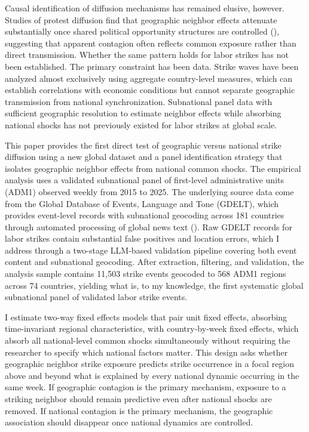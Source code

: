 \documentclass[
  11pt,
]{article}
\begin{document}
Causal identification of diffusion mechanisms has remained elusive,
however. Studies of protest diffusion find that geographic neighbor
effects attenuate substantially once shared political opportunity
structures are controlled (), suggesting that apparent contagion often
reflects common exposure rather than direct transmission. Whether the
same pattern holds for labor strikes has not been established. The
primary constraint has been data. Strike waves have been analyzed almost
exclusively using aggregate country-level measures, which can establish
correlations with economic conditions but cannot separate geographic
transmission from national synchronization. Subnational panel data with
sufficient geographic resolution to estimate neighbor effects while
absorbing national shocks has not previously existed for labor strikes
at global scale.

This paper provides the first direct test of geographic versus national
strike diffusion using a new global dataset and a panel identification
strategy that isolates geographic neighbor effects from national common
shocks. The empirical analysis uses a validated subnational panel of
first-level administrative units (ADM1) observed weekly from 2015 to
2025. The underlying source data come from the Global Database of
Events, Language and Tone (GDELT), which provides event-level records
with subnational geocoding across 181 countries through automated
processing of global news text (). Raw GDELT records for labor strikes contain substantial
false positives and location errors, which I address through a two-stage
LLM-based validation pipeline covering both event content and
subnational geocoding. After extraction, filtering, and validation, the
analysis sample contains 11,503 strike events geocoded to 568 ADM1
regions across 74 countries, yielding what is, to my knowledge, the
first systematic global subnational panel of validated labor strike
events.

I estimate two-way fixed effects models that pair unit fixed effects,
absorbing time-invariant regional characteristics, with country-by-week
fixed effects, which absorb all national-level common shocks
simultaneously without requiring the researcher to specify which
national factors matter. This design asks whether geographic neighbor
strike exposure predicts strike occurrence in a focal region above and
beyond what is explained by every national dynamic occurring in the same
week. If geographic contagion is the primary mechanism, exposure to a
striking neighbor should remain predictive even after national shocks
are removed. If national contagion is the primary mechanism, the
geographic association should disappear once national dynamics are
controlled.
\end{document}
